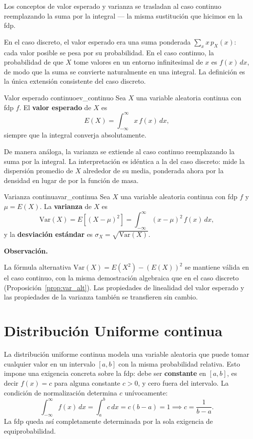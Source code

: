 \documentclass[12pt, a4paper]{book}
\newenvironment{observacion}{%
    \par\medskip\noindent\textbf{\color{azul}Observaci\'{o}n.}\enspace\itshape
}{\par\medskip}
\numberwithin{equation}{chapter}
\begin{document}
Los conceptos de valor esperado y varianza se trasladan al caso
continuo reemplazando la suma por la integral --- la misma sustitución
que hicimos en la fdp.

En el caso discreto, el valor esperado era una suma ponderada
$\sum_x x\, p_X(x)$: cada valor posible se pesa por su
probabilidad. En el caso continuo, la probabilidad de que $X$
tome valores en un entorno infinitesimal de $x$ es $f(x)\,dx$,
de modo que la suma se convierte naturalmente en una integral.
La definición es la única extensión consistente del caso discreto.

\begin{definicion}{Valor esperado continuo}{ev_continuo}
	Sea $X$ una variable aleatoria continua con fdp $f$. El
	\textbf{valor esperado} de $X$ es
	\[
	E(X) = \int_{-\infty}^{\infty} x\, f(x)\,dx,
	\]
	siempre que la integral converja absolutamente.
\end{definicion}

De manera análoga, la varianza se extiende al caso continuo
reemplazando la suma por la integral. La interpretación es
idéntica a la del caso discreto: mide la dispersión promedio
de $X$ alrededor de su media, ponderada ahora por la densidad
en lugar de por la función de masa.

\begin{definicion}{Varianza continua}{var_continua}
	Sea $X$ una variable aleatoria continua con fdp $f$ y
	$\mu = E(X)$. La \textbf{varianza} de $X$ es
	\[
	\mathrm{Var}(X) = E\!\left[(X-\mu)^2\right]
	= \int_{-\infty}^{\infty} (x-\mu)^2\, f(x)\,dx,
	\]
	y la \textbf{desviación estándar} es
	$\sigma_X = \sqrt{\mathrm{Var}(X)}$.
\end{definicion}

\begin{observacion}
	La fórmula alternativa $\mathrm{Var}(X) = E(X^2) - (E(X))^2$
	se mantiene válida en el caso continuo, con la misma demostración
	algebraica que en el caso discreto
	(Proposición~\ref{prop:var_alt}). Las propiedades de
	linealidad del valor esperado y las propiedades de la varianza
	también se transfieren sin cambio.
\end{observacion}

\section{Distribuci\'{o}n Uniforme continua}

La distribución uniforme continua modela una variable aleatoria
que puede tomar cualquier valor en un intervalo $[a,b]$ con la
misma probabilidad relativa. Esto impone una exigencia concreta
sobre la fdp: debe ser \textbf{constante} en $[a,b]$, es decir
$f(x) = c$ para alguna constante $c > 0$, y cero fuera del
intervalo. La condición de normalización determina $c$
unívocamente:
\[
\int_{-\infty}^{\infty} f(x)\,dx
= \int_a^b c\,dx = c(b-a) = 1
\implies c = \frac{1}{b-a}.
\]
La fdp queda así completamente determinada por la sola exigencia
de equiprobabilidad.
\end{document}
